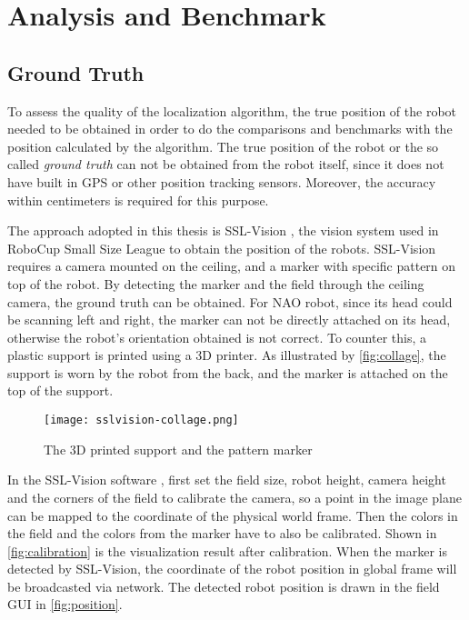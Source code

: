 \chapter{Analysis and Benchmark\label{cha:chapter6}}

\section{Ground Truth}\label{sub:ground truth}
To assess the quality of the localization algorithm, the true position of the robot needed to be obtained in order to do the comparisons and benchmarks with the position calculated by the algorithm. The true position of the robot or the so called \textit{ground truth} can not be obtained from the robot itself, since it does not have built in \gls{GPS} or other position tracking sensors. Moreover, the accuracy within centimeters is required for this purpose. 

The approach adopted in this thesis is SSL-Vision \cite{zickler2010ssl}, the vision system used in RoboCup Small Size League to obtain the position of the robots. SSL-Vision requires a camera mounted on the ceiling, and a marker with specific pattern on top of the robot. By detecting the marker and the field through the ceiling camera, the ground truth can be obtained. For NAO robot, since its head could be scanning left and right, the marker can not be directly attached on its head, otherwise the robot's orientation obtained is not correct. To counter this, a plastic support is printed using a 3D printer. As illustrated by \autoref{fig:collage}, the support is worn by the robot from the back, and the marker is attached on the top of the support.

\begin{figure}[h!]
  \centering
  \texttt{[image: sslvision-collage.png]}
  \caption{The 3D printed support and the pattern marker}
  \label{fig:collage}
\end{figure}

In the SSL-Vision software \cite{sslvision_yuan}, first set the field size, robot height, camera height and the corners of the field to calibrate the camera, so a point in the image plane can be mapped to the coordinate of the physical world frame. Then the colors in the field and the colors from the marker have to also be calibrated. Shown in \autoref{fig:calibration} is the visualization result after calibration. When the marker is detected by SSL-Vision, the coordinate of the robot position in global frame will be broadcasted via network. The detected robot position is drawn in the field GUI in \autoref{fig:position}.\\

